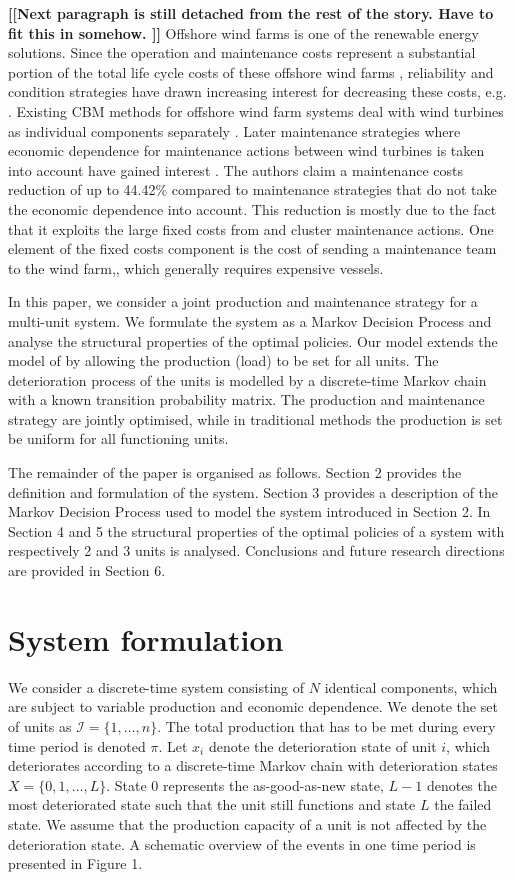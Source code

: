 \documentclass[a4paper,12pt]{article}
\begin{document}
\textbf{[[Next paragraph is still detached from the rest of the story. Have to fit this in somehow. ]]}
Offshore wind farms is one of the renewable energy solutions. Since the operation and maintenance costs represent a substantial portion of the total life cycle costs of these offshore wind farms \cite{hau2003wind}, reliability and condition strategies have drawn increasing interest for decreasing these costs, e.g. \cite{krokoszinski2003efficiency}. Existing CBM methods for offshore wind farm systems deal with wind turbines as individual components separately \citep{avner2007reliability}. Later maintenance strategies where economic dependence for maintenance actions between wind turbines is taken into account have gained interest \citep{tian2011condition}. The authors claim a maintenance costs reduction of up to 44.42\% compared to maintenance strategies that do not take the economic dependence into account. This reduction is mostly due to the fact that it exploits the large fixed costs from and cluster maintenance actions. One element of the fixed costs component is the cost of sending a maintenance team to the wind farm,, which generally requires expensive vessels.

In this paper, we consider a joint production and maintenance strategy for a multi-unit system. We formulate the system as a Markov Decision Process and analyse the structural properties of the optimal policies. Our model extends the model of \cite{OLDEKEIZER2018319} by allowing the production (load) to be set for all units. The deterioration process of the units is modelled by a discrete-time Markov chain with a known transition probability matrix. The production and maintenance strategy are jointly optimised, while in traditional methods the production is set be uniform for all functioning units. 

The remainder of the paper is organised as follows. Section 2 provides the definition and formulation of the system. Section 3 provides a description of the Markov Decision Process used to model the system introduced in Section 2. In Section 4 and 5 the structural properties of the optimal policies of a system with respectively 2 and 3 units is analysed. Conclusions and future research directions are provided in Section 6.


\section{System formulation}
We consider a discrete-time system consisting of $N$ identical components, which are subject to variable production and economic dependence. We denote the set of units as $\mathcal{I} = \{1, \dots, n\}$. The total production that has to be met during every time period is denoted $\pi$.  Let $x_i$ denote the deterioration state of unit $i$, which deteriorates according to a discrete-time Markov chain with deterioration states $X = \{0, 1, \dots, L\}$. State $0$ represents the as-good-as-new state, $L-1$ denotes the most deteriorated state such that the unit still functions and state $L$ the failed state. We assume that the production capacity of a unit is not affected by the deterioration state. A schematic overview of the events in one time period is presented in Figure 1.
\end{document}
